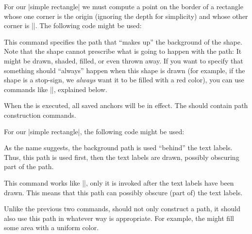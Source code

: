 \begin{command}{\pgfdeclareshape{}}
\begin{command}{\anchorborder{}}
        For our |simple rectangle| we must compute a point on the border of a
        rectangle whose one corner is the origin (ignoring the depth for
        simplicity) and whose other corner is |\upperrightcorner|. The
        following code might be used:
\begin{codeexample}
\anchorborder{%
  \@tempdima=\pgf@x
  \@tempdimb=\pgf@y
  \pgfpointborderrectangle{\pgfpoint{\@tempdima}{\@tempdimb}}{\upperrightcorner}
}
\end{codeexample}
    \end{command}
    \begin{command}{\backgroundpath{}}
        This command specifies the path that ``makes up'' the background of the
        shape. Note that the shape cannot prescribe what is going to happen
        with the path: It might be drawn, shaded, filled, or even thrown away.
        If you want to specify that something should ``always'' happen when
        this shape is drawn (for example, if the shape is a stop-sign, we
        \emph{always} want it to be filled with a red color), you can use
        commands like |\beforebackgroundpath|, explained below.

        When the  is executed, all saved anchors will be in effect.
        The  should contain path construction commands.

        For our |simple rectangle|, the following code might be used:
\begin{codeexample}
\end{codeexample}
        As the name suggests, the background path is used ``behind'' the text
        labels. Thus, this path is used first, then the text labels are drawn,
        possibly obscuring part of the path.
    \end{command}
    \begin{command}{\foregroundpath{}}
        This command works like |\backgroundpath|, only it is invoked after the
        text labels have been drawn. This means that this path can possibly
        obscure (part of) the text labels.
    \end{command}
    \begin{command}{\behindbackgroundpath{}}
        Unlike the previous two commands,  should not only construct
        a path, it should also use this path in whatever way is appropriate.
        For example, the  might fill some area with a uniform color.


\end{command}
\end{command}
